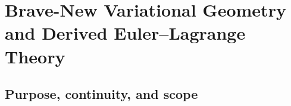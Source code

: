 \providecommand{\XSp}{\mathcal{X}_{\mathrm{Sp}}}
\providecommand{\dR}{\mathrm{dR}}
\providecommand{\Jinf}{J^{\infty}}
\providecommand{\Tinf}{T^{\infty}}
\providecommand{\PDE}{\operatorname{PDE}}
\providecommand{\Coalg}{\operatorname{Coalg}}
\providecommand{\Map}{\operatorname{Map}}
\providecommand{\Eq}{\operatorname{Eq}}
\providecommand{\fib}{\operatorname{fib}}
\providecommand{\hofib}{\operatorname{hofib}}
\providecommand{\cofib}{\operatorname{cofib}}
\providecommand{\Tot}{\operatorname{Tot}}
\providecommand{\Sec}{\operatorname{Sec}}
\providecommand{\Lag}{\operatorname{Lag}}
\providecommand{\EL}{\operatorname{EL}}
\providecommand{\Helm}{\operatorname{Helm}}
\providecommand{\Crit}{\operatorname{Crit}}
\providecommand{\Prim}{\operatorname{Prim}}
\providecommand{\Hess}{\operatorname{Hess}}
\providecommand{\Jac}{\operatorname{Jac}}
\providecommand{\Rvar}{\mathcal R_{\mathrm{var}}}
\providecommand{\Cvar}{C_{\mathrm{var}}}
\providecommand{\Bvar}{B_{\mathrm{var}}}
\providecommand{\Omegavar}{\Omega_{\mathrm{var}}}
\providecommand{\Omegainf}{\Omega_{\mathrm{inf}}}
\providecommand{\Oadd}{\mathcal O^{\mathrm{add}}}
\providecommand{\DRvar}{\mathrm{DR}_{\mathrm{var}}}
\providecommand{\Vfull}{\mathbb V^{\infty}}
\providecommand{\Vfirst}{\mathbb V^{(1)}}
\providecommand{\Vsecond}{\mathbb V^{(2)}}
\providecommand{\BiFil}{\operatorname{BiFil}^{\mathrm{comp}}_{\ge0}}
\providecommand{\ClVar}{\operatorname{ClVar}}
\providecommand{\EulMod}{\operatorname{Eul}}
\providecommand{\HessDesc}{\operatorname{HessDesc}}
\providecommand{\RealH}{\operatorname{Real}_{H}}
\providecommand{\TransH}{\operatorname{Trans}_{H}}
\providecommand{\Lep}{\operatorname{Lep}}
\providecommand{\Fld}{\operatorname{Fld}}
\providecommand{\Act}{\operatorname{Act}}
\providecommand{\Dens}{\operatorname{Dens}}
\providecommand{\Real}{\operatorname{Real}}
\providecommand{\HelmLift}{\operatorname{HelmLift}}
\providecommand{\LagPrim}{\operatorname{LagPrim}}
\providecommand{\one}{\mathbf 1}
\providecommand{\id}{\operatorname{id}}
\providecommand{\pr}{\operatorname{pr}}

\chapter{Brave-New Variational Geometry and Derived Euler--Lagrange Theory}
\label{chap:brave-new-variational}

\section{Purpose, continuity, and scope}
\label{sec:var-purpose}

